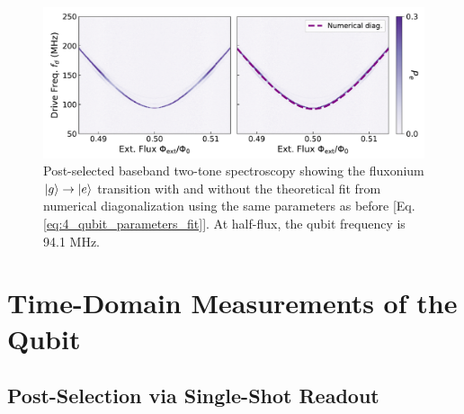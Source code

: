 \begin{figure}[!b]
    \centering
    \includegraphics[width=0.9\linewidth]{Figures/4/qubit_spectroscopy.pdf}
    \caption{Post-selected baseband two-tone spectroscopy showing the fluxonium $\lvert g\rangle\to\lvert e\rangle$ transition with and without the theoretical fit from numerical diagonalization using the same parameters as before [Eq. \eqref{eq:4_qubit_parameters_fit}]. At half-flux, the qubit frequency is 94.1 MHz.}
\label{fig:4_qubit_spectroscopy}
\end{figure}

\section{Time-Domain Measurements of the Qubit \label{sec:4_Time_Domain}}

\subsection{Post-Selection via Single-Shot Readout}

